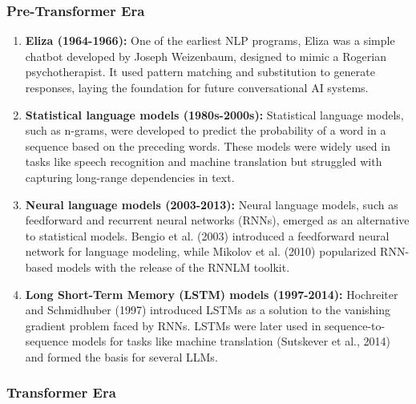 \subsubsection*{Pre-Transformer Era}

\begin{enumerate}
    \item \textbf{Eliza (1964-1966):} One of the earliest NLP programs, Eliza was a simple chatbot developed by Joseph Weizenbaum, designed to mimic a Rogerian psychotherapist. It used pattern matching and substitution to generate responses, laying the foundation for future conversational AI systems.
    \item \textbf{Statistical language models (1980s-2000s):} Statistical language models, such as n-grams, were developed to predict the probability of a word in a sequence based on the preceding words. These models were widely used in tasks like speech recognition and machine translation but struggled with capturing long-range dependencies in text.
    \item \textbf{Neural language models (2003-2013):} Neural language models, such as feedforward and recurrent neural networks (RNNs), emerged as an alternative to statistical models. Bengio et al. (2003) introduced a feedforward neural network for language modeling, while Mikolov et al. (2010) popularized RNN-based models with the release of the RNNLM toolkit.
    \item \textbf{Long Short-Term Memory (LSTM) models (1997-2014):} Hochreiter and Schmidhuber (1997) introduced LSTMs as a solution to the vanishing gradient problem faced by RNNs. LSTMs were later used in sequence-to-sequence models for tasks like machine translation (Sutskever et al., 2014) and formed the basis for several LLMs.
\end{enumerate}

\subsubsection*{Transformer Era}

